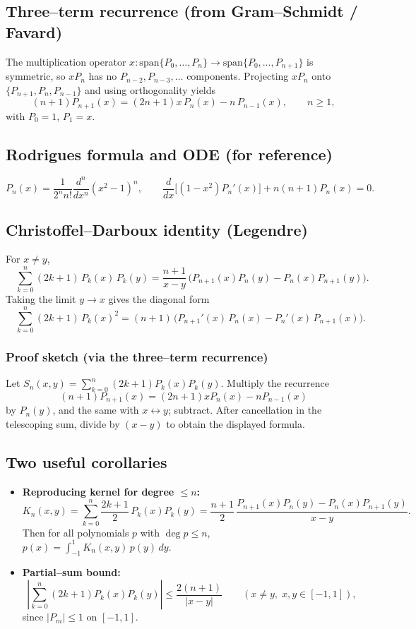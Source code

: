 \documentclass[12pt,a4paper]{article}
\theoremstyle{plain}
\theoremstyle{definition}
\theoremstyle{remark}
\theoremstyle{remark}
\begin{document}
\subsection*{Three--term recurrence (from Gram--Schmidt / Favard)}
The multiplication operator $x:\mathrm{span}\{P_0,\dots,P_n\}\to\mathrm{span}\{P_0,\dots,P_{n+1}\}$ is symmetric,
so $xP_n$ has no $P_{n-2},P_{n-3},\dots$ components.
Projecting $xP_n$ onto $\{P_{n+1},P_n,P_{n-1}\}$ and using orthogonality yields
\[
(n+1)P_{n+1}(x)=(2n+1)x\,P_n(x)-n\,P_{n-1}(x),\qquad n\ge1,
\]
with $P_0=1$, $P_1=x$.

\subsection*{Rodrigues formula and ODE (for reference)}
\[
P_n(x)=\frac{1}{2^n n!}\frac{d^n}{dx^n}(x^2-1)^n,
\qquad
\frac{d}{dx}\!\Big[(1-x^2)P_n'(x)\Big]+n(n+1)P_n(x)=0.
\]

\subsection*{Christoffel--Darboux identity (Legendre)}
For $x\ne y$,
\[
\boxed{\quad
	\sum_{k=0}^{n} (2k+1)\,P_k(x)\,P_k(y)
	= \frac{n+1}{x-y}\,\Big(P_{n+1}(x)P_n(y)-P_n(x)P_{n+1}(y)\Big).
	\quad}
\]
Taking the limit $y\to x$ gives the diagonal form
\[
\boxed{\quad
	\sum_{k=0}^{n} (2k+1)\,P_k(x)^2
	= (n+1)\,\big(P_{n+1}'(x)\,P_n(x)-P_n'(x)\,P_{n+1}(x)\big).
	\quad}
\]

\subsubsection*{Proof sketch (via the three--term recurrence)}
Let $S_n(x,y)=\sum_{k=0}^{n} (2k+1)P_k(x)P_k(y)$.
Multiply the recurrence
\[
(n+1)P_{n+1}(x)=(2n+1)xP_n(x)-nP_{n-1}(x)
\]
by $P_n(y)$, and the same with $x\leftrightarrow y$; subtract.
After cancellation in the telescoping sum, divide by $(x-y)$ to obtain the displayed formula.

\subsection*{Two useful corollaries}
\begin{itemize}\setlength{\itemsep}{0.5em}
	\item \textbf{Reproducing kernel for degree $\le n$:}
	\[
	K_n(x,y)=\sum_{k=0}^{n}\frac{2k+1}{2}\,P_k(x)P_k(y)
	=\frac{n+1}{2}\,\frac{P_{n+1}(x)P_n(y)-P_n(x)P_{n+1}(y)}{x-y}.
	\]
	Then for all polynomials $p$ with $\deg p\le n$,
	\(
	p(x)=\int_{-1}^{1} K_n(x,y)\,p(y)\,dy.
	\)
	
	\item \textbf{Partial--sum bound:}
	\[
	\left|\sum_{k=0}^{n}(2k+1)P_k(x)P_k(y)\right|
	\le \frac{2(n+1)}{|x-y|}\qquad (x\ne y,\; x,y\in[-1,1]),
	\]
	since $|P_m|\le1$ on $[-1,1]$.
\end{itemize}
\end{document}
